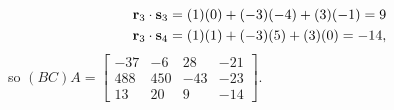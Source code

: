 \begin{example}
\begin{align*}
\mathbf{r}_3 \cdot \mathbf{s}_3 &= (1)(0)+(-3)(-4)+(3)(-1) = 9 \\
\mathbf{r}_3 \cdot \mathbf{s}_4 &= (1)(1)+(-3)(5)+(3)(0) = -14,
\end{align*}
so $(BC)A =  \left[ \begin{array}{rrrr} -37&-6&28&-21 \\ 488&450&-43&-23 \\ 13&20&9&-14 \end{array} \right]$. 


\end{example}
